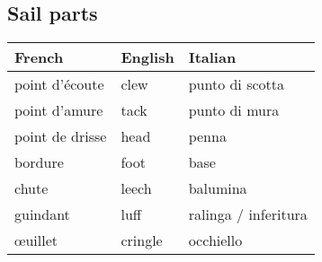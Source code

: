 \documentclass[a4paper, 12pt, twoside]{article}
\begin{document}
    \begin{indt}{\section{Sail parts}} %
        \begin{tabular}{|l|l|l|}
            \hline %
            \textbf{French}
            & \textbf{English}
            & \textbf{Italian}
            \\
            \hline
            \hline %
            point d'écoute %
            & clew
            & punto di scotta
            \\
            \hline %
            point d'amure %
            & tack
            & punto di mura
            \\
            \hline %
            point de drisse %
            & head
            & penna
            \\
            \hline %
            bordure %
            & foot
            & base
            \\
            \hline %
            chute %
            & leech
            & balumina
            \\
            \hline %
            guindant %
            & luff
            & ralinga / inferitura
            \\
            \hline %
            \oe uillet  %
            & cringle
            & occhiello
            \\
            \hline %
        \end{tabular}
    \end{indt} %
\end{document}
